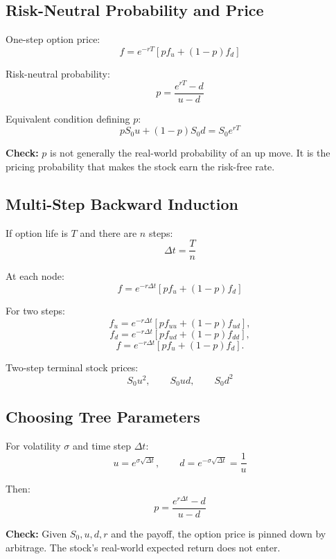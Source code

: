 \documentclass[10pt]{article}
\newcommand{\formula}[1]{\[
    \boxed{\displaystyle #1}
\]}
\newcommand{\note}[1]{\textcolor{accent}{\textbf{Check:}} #1}
\begin{document}
\begin{multicols}{2}
\subsection*{Risk-Neutral Probability and Price}
One-step option price:
\formula{f=e^{-rT}\left[p f_u+(1-p)f_d\right]}

Risk-neutral probability:
\formula{p=\frac{e^{rT}-d}{u-d}}

Equivalent condition defining $p$:
\formula{pS_0u+(1-p)S_0d=S_0e^{rT}}

\note{$p$ is not generally the real-world probability of an up move. It is the pricing probability that makes the stock earn the risk-free rate.}

\subsection*{Multi-Step Backward Induction}
If option life is $T$ and there are $n$ steps:
\formula{\Delta t=\frac{T}{n}}

At each node:
\formula{f=e^{-r\Delta t}\left[p f_u+(1-p)f_d\right]}

For two steps:
\[
    f_u=e^{-r\Delta t}\left[p f_{uu}+(1-p)f_{ud}\right],
\]
\[
    f_d=e^{-r\Delta t}\left[p f_{ud}+(1-p)f_{dd}\right],
\]
\[
    f=e^{-r\Delta t}\left[p f_u+(1-p)f_d\right].
\]

Two-step terminal stock prices:
\formula{S_0u^2,\qquad S_0ud,\qquad S_0d^2}

\subsection*{Choosing Tree Parameters}
For volatility $\sigma$ and time step $\Delta t$:
\formula{u=e^{\sigma\sqrt{\Delta t}},\qquad
d=e^{-\sigma\sqrt{\Delta t}}=\frac{1}{u}}

Then:
\formula{p=\frac{e^{r\Delta t}-d}{u-d}}

\note{Given $S_0,u,d,r$ and the payoff, the option price is pinned down by arbitrage. The stock's real-world expected return does not enter.}

\end{multicols}
\end{document}
